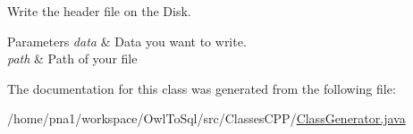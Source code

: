 Write the header file on the Disk. 


\begin{DoxyParams}{Parameters}
{\em data} & Data you want to write. \\
\hline
{\em path} & Path of your file \\
\hline
\end{DoxyParams}


The documentation for this class was generated from the following file:\begin{DoxyCompactItemize}
\item 
/home/pna1/workspace/OwlToSql/src/ClassesCPP/\hyperlink{_class_generator_8java}{ClassGenerator.java}\end{DoxyCompactItemize}

